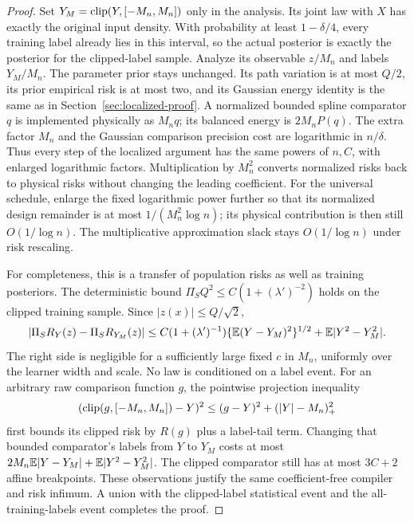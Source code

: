 \begin{proof}
Set $Y_M=\operatorname{clip}(Y,[-M_n,M_n])$ only in the analysis. Its joint law
with $X$ has exactly the original input density. With probability
at least $1-\delta/4$, every training label already lies in this
interval, so the actual posterior is exactly the posterior for the
clipped-label sample. Analyze its observable $z/M_n$ and labels
$Y_M/M_n$. The parameter prior stays unchanged. Its path variation is
at most $Q/2$, its prior empirical risk is at most two, and its Gaussian
energy identity is the same as in Section~\ref{sec:localized-proof}.
A normalized bounded spline comparator $q$ is implemented physically
as $M_nq$; its balanced energy is $2M_nP(q)$. The extra factor $M_n$
and the Gaussian comparison precision cost are logarithmic in $n/\delta$.
Thus every step of the localized argument has the same powers of $n,C$,
with enlarged logarithmic factors. Multiplication by $M_n^2$ converts
normalized risks back to physical risks without changing the leading
coefficient. For the universal schedule, enlarge the fixed logarithmic
power further so that its normalized design remainder is at most
$1/(M_n^2\log n)$; its physical contribution is then still
$O(1/\log n)$. The multiplicative approximation slack stays
$O(1/\log n)$ under risk rescaling.

For completeness, this is a transfer of population risks as well as
training posteriors. The deterministic bound
$\Pi_SQ^2\le C(1+(\lambda')^{-2})$ holds on the clipped training sample.
Since $|z(x)|\le Q/\sqrt2$,
\[
 |\Pi_SR_Y(z)-\Pi_SR_{Y_M}(z)|
 \le C(1+(\lambda')^{-1})\{\mathbb E(Y-Y_M)^2\}^{1/2}
           +\mathbb E|Y^2-Y_M^2|.
\]
The right side is negligible for a sufficiently large fixed $c$ in
$M_n$, uniformly over the learner width and scale. No law is conditioned
on a label event. For an arbitrary raw comparison function $g$, the
pointwise projection inequality
\[
 (\operatorname{clip}(g,[-M_n,M_n])-Y)^2
 \le(g-Y)^2+(|Y|-M_n)_+^2
\]
first bounds its clipped risk by $R(g)$ plus a label-tail term.
Changing that bounded comparator's labels from $Y$ to $Y_M$ costs
at most $2M_n\mathbb E|Y-Y_M|+\mathbb E|Y^2-Y_M^2|$.
The clipped comparator still has at most $3C+2$ affine breakpoints.
These observations justify the same coefficient-free compiler and
risk infimum. A union with the clipped-label statistical event and
the all-training-labels event completes the proof.
\end{proof}
